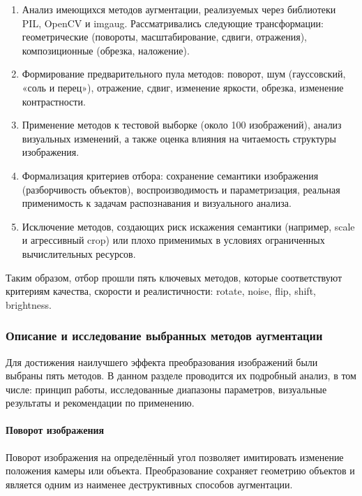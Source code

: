 \begin{enumerate}
	\item Анализ имеющихся методов аугментации, реализуемых через библиотеки PIL, OpenCV и imgaug. Рассматривались следующие трансформации: геометрические (повороты, масштабирование, сдвиги, отражения), композиционные (обрезка, наложение).
	\item Формирование предварительного пула методов: поворот, шум (гауссовский, «соль и перец»), отражение, сдвиг, изменение яркости, обрезка, изменение контрастности.
	\item Применение методов к тестовой выборке (около 100 изображений), анализ визуальных изменений, а также оценка влияния на читаемость структуры изображения.
	\item Формализация критериев отбора: сохранение семантики изображения (разборчивость объектов), воспроизводимость и параметризация, реальная применимость к задачам распознавания и визуального анализа.
	\item Исключение методов, создающих риск искажения семантики (например, scale и агрессивный crop) или плохо применимых в условиях ограниченных вычислительных ресурсов.
\end{enumerate}


Таким образом, отбор прошли пять ключевых методов, которые соответствуют критериям качества, скорости и реалистичности: rotate, noise, flip, shift, brightness.

\subsubsection{Описание и исследование выбранных методов аугментации}

Для достижения наилучшего эффекта преобразования изображений были выбраны пять методов. В данном разделе проводится их подробный анализ, в том числе: принцип работы, исследованные диапазоны параметров, визуальные результаты и рекомендации по применению.


\paragraph{Поворот изображения}

Поворот изображения на определённый угол позволяет имитировать изменение положения камеры или объекта. Преобразование сохраняет геометрию объектов и является одним из наименее деструктивных способов аугментации.

